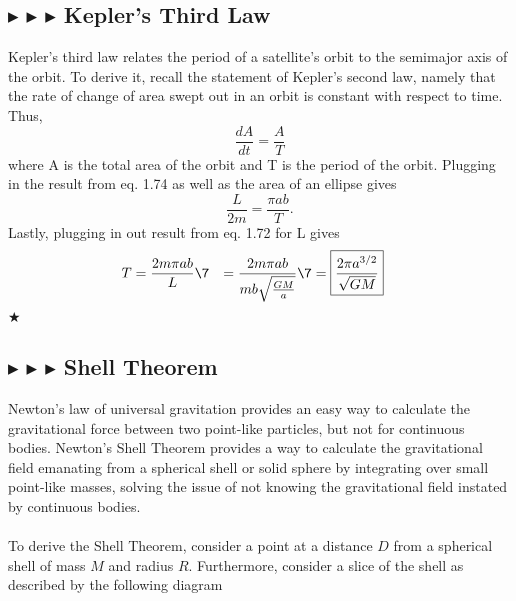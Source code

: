 %
%
\subsection{\color{PineGreen} $\blacktriangleright$ \color{Goldenrod} $\blacktriangleright$ \color{Orchid} $\blacktriangleright$ \color{black} Kepler's Third Law} 
Kepler's third law relates the period of a satellite's orbit to the semimajor axis of the orbit. To derive it, recall the statement of Kepler's second law, namely that the rate of change of area swept out in an orbit is constant with respect to time. Thus, 
\begin{equation}
    \frac{dA}{dt} = \frac{A}{T}
\end{equation}
\noindent where A is the total area of the orbit and T is the period of the orbit. Plugging in the result from eq. 1.74 as well as the area of an ellipse gives
\begin{equation*}
    \frac{L}{2m} = \frac{\pi ab}{T}.
\end{equation*}
\noindent Lastly, plugging in out result from eq. 1.72 for L gives
\begin{align}
    T &= \frac{2m\pi ab}{L} \7
    &= \frac{2m\pi ab}{mb\sqrt{\frac{GM}{a}}} \7
    &= \boxed{\frac{2\pi a^{3/2}}{\sqrt{GM}}}
\end{align}
$\bigstar$

%
%
\subsection{\color{PineGreen} $\blacktriangleright$ \color{Goldenrod} $\blacktriangleright$ \color{Orchid} $\blacktriangleright$ \color{black} Shell Theorem}
Newton's law of universal gravitation provides an easy way to calculate the gravitational force between two point-like particles, but not for continuous bodies. Newton's Shell Theorem provides a way to calculate the gravitational field emanating from a spherical shell or solid sphere by integrating over small point-like masses, solving the issue of not knowing the gravitational field instated by continuous bodies. \\
\\
\noindent To derive the Shell Theorem, consider a point at a distance $D$ from a spherical shell of mass $M$ and radius $R$. Furthermore, consider a slice of the shell as described by the following diagram 

\newpage

